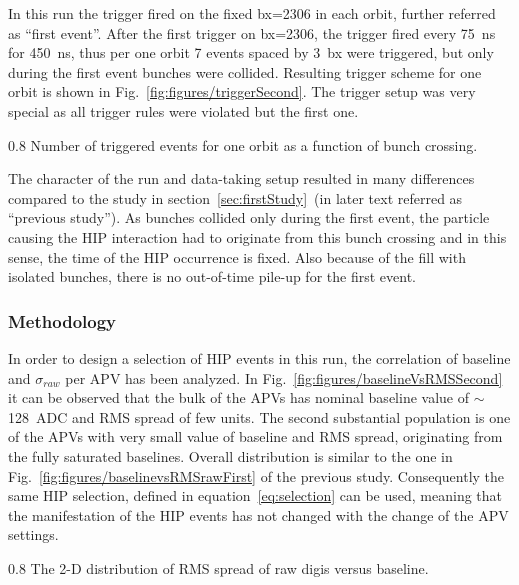 In this run the trigger fired on the fixed bx=2306 in each orbit, further referred as ``first event''. After the first trigger on bx=2306, the trigger fired every 75~ns for 450~ns, thus per one orbit 7 events spaced by 3~bx were triggered, but only during the first event bunches were collided. Resulting trigger scheme for one orbit is shown in Fig.~\ref{fig:figures/triggerSecond}. The trigger setup was very special as all trigger rules were violated but the first one.

                 {0.8}       %
                 {Number of triggered events for one orbit as a function of bunch crossing.} %

The character of the run and data-taking setup resulted in many differences compared to the study in section~\ref{sec:firstStudy}~(in later text referred as ``previous study''). As bunches collided only during the first event, the particle causing the HIP interaction had to originate from this bunch crossing and in this sense, the time of the HIP occurrence is fixed. Also because of the fill with isolated bunches, there is no out-of-time pile-up for the first event.

\subsubsection{Methodology}

In order to design a selection of HIP events in this run, the correlation of baseline and $\sigma_{raw}$ per APV has been analyzed. In Fig.~\ref{fig:figures/baselineVsRMSSecond} it can be observed that the bulk of the APVs has nominal baseline value of $\sim$128~ADC and RMS spread of few units. The second substantial population is one of the APVs with very small value of baseline and RMS spread, originating from the fully saturated baselines. Overall distribution is similar to the one in Fig.~\ref{fig:figures/baselinevsRMSrawFirst} of the previous study. Consequently the same HIP selection, defined in equation~\ref{eq:selection} can be used, meaning that the manifestation of the HIP events has not changed with the change of the APV settings.

                 {0.8}       %
                 {The 2-D distribution of RMS spread of raw digis versus baseline. } %


